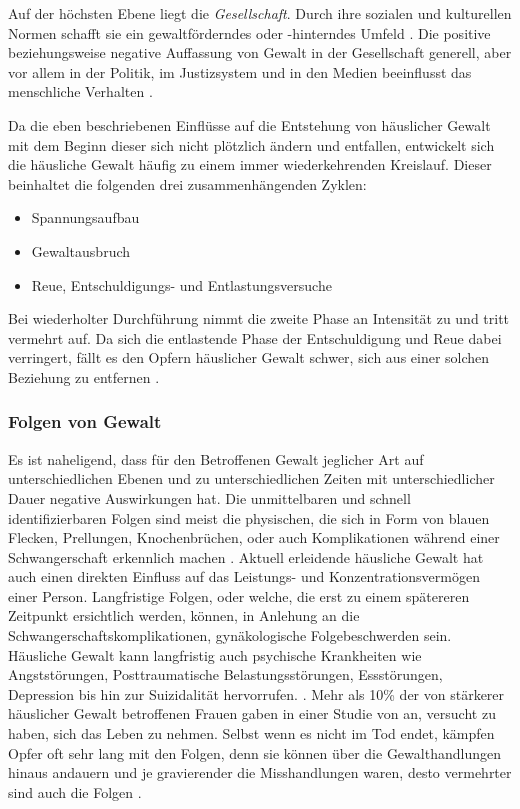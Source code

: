 Auf der höchsten Ebene liegt die \textit{Gesellschaft}. Durch ihre sozialen und kulturellen Normen schafft sie ein gewaltförderndes oder -hinterndes Umfeld \parencite{Ursache_hG_2, Ursache_hG, Gewaltart}. Die positive beziehungsweise negative Auffassung von Gewalt in der Gesellschaft generell, aber vor allem in der Politik, im Justizsystem und in den Medien beeinflusst das menschliche Verhalten \parencite{Ursache_hG_2, Ursache_hG}.  

Da die eben beschriebenen Einflüsse auf die Entstehung von häuslicher Gewalt mit dem Beginn dieser sich nicht plötzlich ändern und entfallen, entwickelt sich die häusliche Gewalt häufig zu einem immer wiederkehrenden Kreislauf. Dieser beinhaltet die folgenden drei zusammenhängenden Zyklen: 

\begin{itemize}
    \item Spannungsaufbau
    \item Gewaltausbruch
    \item Reue, Entschuldigungs- und Entlastungsversuche
\end{itemize}

Bei wiederholter Durchführung nimmt die zweite Phase an Intensität zu und tritt vermehrt auf. Da sich die entlastende Phase der Entschuldigung und Reue dabei verringert, fällt es den Opfern häuslicher Gewalt schwer, sich aus einer solchen Beziehung zu entfernen \parencite{Def_haus_Gewalt}.


\subsubsection{Folgen von Gewalt}     \label{2.1.2.3}
Es ist naheligend, dass für den Betroffenen Gewalt jeglicher Art auf unterschiedlichen Ebenen und zu unterschiedlichen Zeiten mit unterschiedlicher Dauer negative Auswirkungen hat. Die unmittelbaren und schnell identifizierbaren Folgen sind meist die physischen, die sich in Form von blauen Flecken, Prellungen, Knochenbrüchen, oder auch Komplikationen während einer Schwangerschaft erkennlich machen \parencite{Def_Form_Folge_Gewalt, Gewaltart}. Aktuell erleidende häusliche Gewalt hat auch einen direkten Einfluss auf das Leistungs- und Konzentrationsvermögen einer Person. Langfristige Folgen, oder welche, die erst zu einem spätereren Zeitpunkt ersichtlich werden, können, in Anlehung an die Schwangerschaftskomplikationen, gynäkologische Folgebeschwerden sein. Häusliche Gewalt kann langfristig auch psychische Krankheiten wie Angststörungen, Posttraumatische Belastungsstörungen, Essstörungen, Depression bis hin zur Suizidalität hervorrufen. \parencite{Def_Form_Folge_Gewalt, Gewaltart}. Mehr als 10\% der von stärkerer häuslicher Gewalt betroffenen Frauen gaben in einer Studie von \textcite{psy_Folgen_hG} an, versucht zu haben, sich das Leben zu nehmen. Selbst wenn es nicht im Tod endet, kämpfen Opfer oft sehr lang mit den Folgen, denn sie können über die Gewalthandlungen hinaus andauern \parencite{Def_haus_Gewalt} und je gravierender die Misshandlungen waren, desto vermehrter sind auch die Folgen \parencite{Gewaltart}.

